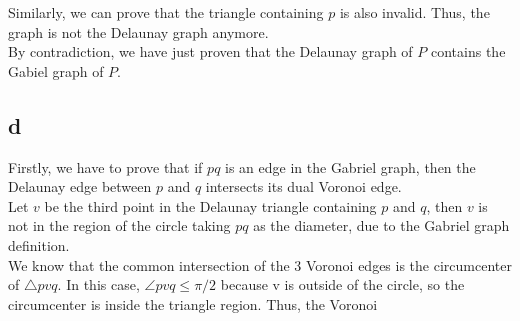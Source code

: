 Similarly, we can prove that the triangle containing $p$ is also invalid. Thus, the graph is not the Delaunay graph anymore. \\

By contradiction, we have just proven that the Delaunay graph of $P$ contains the Gabiel graph of $P$.

\subsection*{d}

Firstly, we have to prove that if $pq$ is an edge in the Gabriel graph, then the Delaunay edge between $p$ and $q$ intersects its dual Voronoi edge.\\

Let $v$ be the third point in the Delaunay triangle containing $p$ and $q$, then $v$ is not in the region of the circle taking $pq$ as the diameter, due to the Gabriel graph definition. \\

We know that the common intersection of the 3 Voronoi edges is the circumcenter of $\bigtriangleup pvq$. In this case, $\angle pvq \leq \pi / 2$ because v is outside of the circle, so the circumcenter is inside the triangle region. Thus, the Voronoi 

